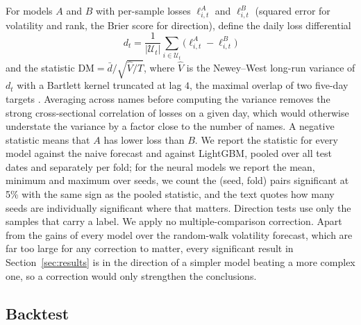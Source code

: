 \documentclass[10pt,a4paper,twoside,twocolumn]{article}
\begin{document}
For models $A$ and $B$ with per-sample losses $\ell^A_{i,t}$ and $\ell^B_{i,t}$ (squared error for volatility and rank, the Brier score \citep{brier1950verification} for direction), define the daily loss differential
\begin{equation}
d_t=\frac{1}{|\mathcal{U}_t|}\sum_{i\in\mathcal{U}_t}\big(\ell^A_{i,t}-\ell^B_{i,t}\big)
\end{equation}
and the statistic $\text{DM}=\bar d/\sqrt{\hat V/T}$, where $\hat V$ is the Newey--West \citep{newey1987simple} long-run variance of $d_t$ with a Bartlett kernel truncated at lag $4$, the maximal overlap of two five-day targets \citep{diebold1995comparing}. Averaging across names before computing the variance removes the strong cross-sectional correlation of losses on a given day, which would otherwise understate the variance by a factor close to the number of names. A negative statistic means that $A$ has lower loss than $B$. We report the statistic for every model against the naive forecast and against LightGBM, pooled over all test dates and separately per fold; for the neural models we report the mean, minimum and maximum over seeds, we count the (seed, fold) pairs significant at 5\% with the same sign as the pooled statistic, and the text quotes how many seeds are individually significant where that matters. Direction tests use only the samples that carry a label. We apply no multiple-comparison correction. Apart from the gains of every model over the random-walk volatility forecast, which are far too large for any correction to matter, every significant result in Section~\ref{sec:results} is in the direction of a simpler model beating a more complex one, so a correction would only strengthen the conclusions.

\subsection{Backtest}\label{sec:backtest}
\end{document}

